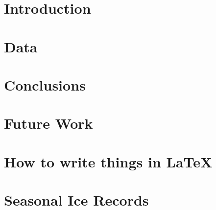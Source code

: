 \documentclass[12pt, oneside]{book}
\begin{document}
\tableofcontents
\listoffigures
\listoftables

\mainmatter

\chapter{Introduction}


\chapter{Data}


\chapter{Conclusions}


\chapter{Future Work}


\chapter{How to write things in LaTeX}





\appendix 
\chapter{Seasonal Ice Records}
\label{sec:appendix_a}

\end{document}
